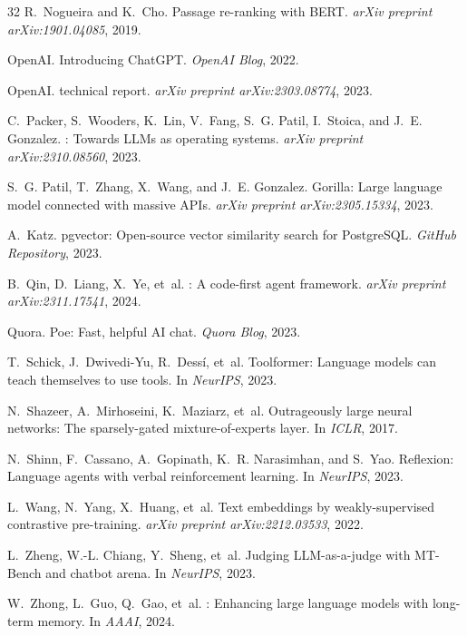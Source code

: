 \begin{thebibliography}{32}
R.~Nogueira and K.~Cho.
\newblock Passage re-ranking with {BERT}.
\newblock \emph{arXiv preprint arXiv:1901.04085}, 2019.

OpenAI.
\newblock Introducing {ChatGPT}.
\newblock \emph{OpenAI Blog}, 2022.

OpenAI.
 technical report.
\newblock \emph{arXiv preprint arXiv:2303.08774}, 2023.

C.~Packer, S.~Wooders, K.~Lin, V.~Fang, S.~G. Patil, I.~Stoica, and J.~E. Gonzalez.
: Towards {LLM}s as operating systems.
\newblock \emph{arXiv preprint arXiv:2310.08560}, 2023.

S.~G. Patil, T.~Zhang, X.~Wang, and J.~E. Gonzalez.
\newblock Gorilla: Large language model connected with massive {API}s.
\newblock \emph{arXiv preprint arXiv:2305.15334}, 2023.

A.~Katz.
\newblock pgvector: Open-source vector similarity search for {PostgreSQL}.
\newblock \emph{GitHub Repository}, 2023.

B.~Qin, D.~Liang, X.~Ye, et~al.
: A code-first agent framework.
\newblock \emph{arXiv preprint arXiv:2311.17541}, 2024.

Quora.
\newblock Poe: Fast, helpful {AI} chat.
\newblock \emph{Quora Blog}, 2023.

T.~Schick, J.~Dwivedi-Yu, R.~Dess\'i, et~al.
\newblock Toolformer: Language models can teach themselves to use tools.
\newblock In \emph{NeurIPS}, 2023.

N.~Shazeer, A.~Mirhoseini, K.~Maziarz, et~al.
\newblock Outrageously large neural networks: The sparsely-gated mixture-of-experts layer.
\newblock In \emph{ICLR}, 2017.

N.~Shinn, F.~Cassano, A.~Gopinath, K.~R. Narasimhan, and S.~Yao.
\newblock Reflexion: Language agents with verbal reinforcement learning.
\newblock In \emph{NeurIPS}, 2023.

L.~Wang, N.~Yang, X.~Huang, et~al.
\newblock Text embeddings by weakly-supervised contrastive pre-training.
\newblock \emph{arXiv preprint arXiv:2212.03533}, 2022.

L.~Zheng, W.-L. Chiang, Y.~Sheng, et~al.
\newblock Judging {LLM}-as-a-judge with {MT-Bench} and chatbot arena.
\newblock In \emph{NeurIPS}, 2023.

W.~Zhong, L.~Guo, Q.~Gao, et~al.
: Enhancing large language models with long-term memory.
\newblock In \emph{AAAI}, 2024.

\end{thebibliography}

